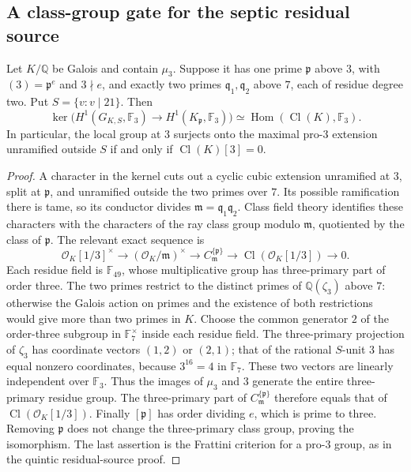 
\subsection{A class-group gate for the septic residual source}

\begin{lemma}
\label{lem:lm-septic-ray-gate}
Let $K/\mathbb Q$ be Galois and contain $\mu_3$.
Suppose it has one prime $\mathfrak p$ above $3$, with
$(3)=\mathfrak p^e$ and $3\nmid e$, and exactly two primes
$\mathfrak q_1,\mathfrak q_2$ above $7$, each of residue
degree two.  Put $S=\{v:v\mid21\}$.
Then
\[
 \ker\bigl(H^1(G_{K,S},\mathbb F_3)
       \longrightarrow H^1(K_{\mathfrak p},\mathbb F_3)\bigr)
 \simeq\operatorname{Hom}(\operatorname{Cl}(K),\mathbb F_3).
\]
In particular, the local group at $3$ surjects onto the
maximal pro-$3$ extension unramified outside $S$ if and
only if $\operatorname{Cl}(K)[3]=0$.
\end{lemma}
\begin{proof}
A character in the kernel cuts out a cyclic cubic extension
unramified at $3$, split at $\mathfrak p$, and unramified
outside the two primes over $7$.  Its possible ramification
there is tame, so its conductor divides
$\mathfrak m=\mathfrak q_1\mathfrak q_2$.
Class field theory identifies these characters with the
characters of the ray class group modulo $\mathfrak m$,
quotiented by the class of $\mathfrak p$.
The relevant exact sequence is
\[
 \mathcal O_K[1/3]^\times\longrightarrow
 (\mathcal O_K/\mathfrak m)^\times\longrightarrow
 C_{\mathfrak m}^{\{\mathfrak p\}}\longrightarrow
 \operatorname{Cl}(\mathcal O_K[1/3])\longrightarrow0.
\]
Each residue field is $\mathbb F_{49}$, whose multiplicative
group has three-primary part of order three.  The two
primes restrict to the distinct primes of
$\mathbb Q(\zeta_3)$ above $7$: otherwise the Galois action
on primes and the existence of both restrictions would
give more than two primes in $K$.
Choose the common generator $2$ of the order-three subgroup
in $\mathbb F_7^\times$ inside each residue field.
The three-primary projection of $\zeta_3$ has coordinate
vectors $(1,2)$ or $(2,1)$; that of the rational
$S$-unit $3$ has equal nonzero coordinates, because
$3^{16}=4$ in $\mathbb F_7$.
These two vectors are linearly independent over $\mathbb F_3$.
Thus the images of $\mu_3$ and $3$ generate the entire
three-primary residue group.
The three-primary part of $C_{\mathfrak m}^{\{\mathfrak p\}}$
therefore equals that of
$\operatorname{Cl}(\mathcal O_K[1/3])$.
Finally $[\mathfrak p]$ has order dividing $e$, which is
prime to three.  Removing $\mathfrak p$ does not change
the three-primary class group, proving the isomorphism.
The last assertion is the Frattini criterion for a
pro-$3$ group, as in the quintic residual-source proof.
\end{proof}

